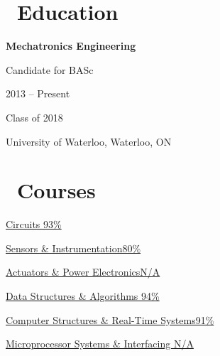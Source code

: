 \documentclass{resume}
\begin{document}
\begin{multicols}{2}

\section{\faGraduationCap\ Education}
\textbf{Mechatronics Engineering}\par
Candidate for BASc\par
2013 -- Present\par
Class of 2018\par
University of Waterloo, Waterloo, ON

\columnbreak

\section{\faBook\ Courses}
\href{http://www.ucalendar.uwaterloo.ca/1516/COURSE/course-MTE.html#MTE120}{Circuits \hfill 93\%} \par
\href{http://www.ucalendar.uwaterloo.ca/1516/COURSE/course-MTE.html#MTE220}{Sensors \& Instrumentation\hfill 80\%}\par
\href{http://www.ucalendar.uwaterloo.ca/1516/COURSE/course-MTE.html#MTE320}{Actuators \& Power Electronics\hfill N/A}\par

\href{http://www.ucalendar.uwaterloo.ca/1516/COURSE/course-MTE.html#MTE262}{Data Structures \& Algorithms \hfill 94\%}\par
\href{http://www.ucalendar.uwaterloo.ca/1516/COURSE/course-MTE.html#MTE241}{Computer Structures \& Real-Time Systems\hfill 91\%}\par
\href{http://www.ucalendar.uwaterloo.ca/1516/COURSE/course-MTE.html#MTE341}{Microprocessor Systems \& Interfacing \hfill N/A}

\end{multicols}
\end{document}
